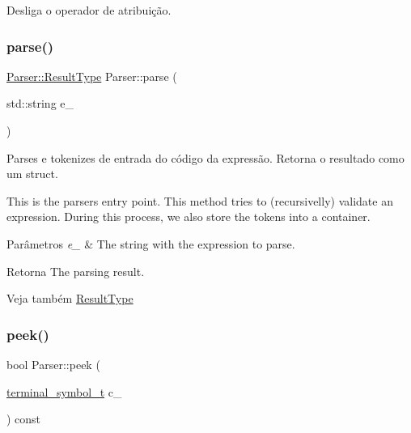 Desliga o operador de atribuição. 

\mbox{\label{classParser_a0ae862fb78eb349777532c6d120d0d25}} 
\subsubsection{\texorpdfstring{parse()}{parse()}}
{\footnotesize\ttfamily \hyperlink{structParser_1_1ResultType}{Parser\+::\+Result\+Type} Parser\+::parse (\begin{DoxyParamCaption}\item[{std\+::string}]{e\+\_\+ }\end{DoxyParamCaption})}



Parses e tokenizes de entrada do código da expressão. Retorna o resultado como um struct. 

This is the parser\textquotesingle{}s entry point. This method tries to (recursivelly) validate an expression. During this process, we also store the tokens into a container.


\begin{DoxyParams}{Parâmetros}
{\em e\+\_\+} & The string with the expression to parse. \\
\hline
\end{DoxyParams}
\begin{DoxyReturn}{Retorna}
The parsing result.
\end{DoxyReturn}
\begin{DoxySeeAlso}{Veja também}
\hyperlink{structParser_1_1ResultType}{Result\+Type} 
\end{DoxySeeAlso}
\mbox{\label{classParser_a38df5f6fc75d85cc6907ae21e11c5b16}} 
\subsubsection{\texorpdfstring{peek()}{peek()}}
{\footnotesize\ttfamily bool Parser\+::peek (\begin{DoxyParamCaption}\item[{\hyperlink{classParser_a7d49b050a3c0df9e37ff81c5099be049}{terminal\+\_\+symbol\+\_\+t}}]{c\+\_\+ }\end{DoxyParamCaption}) const\hspace{0.3cm}{\ttfamily [private]}}




